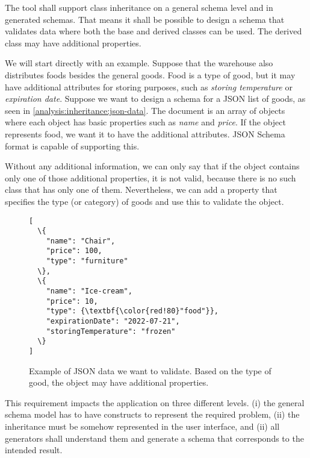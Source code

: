 

\begin{requirement}
    The tool shall support class inheritance on a general schema level and in generated schemas. That means it shall be possible to design a schema that validates data where both the base and derived classes can be used. The derived class may have additional properties.
\end{requirement}

\begin{showcase}
    We will start directly with an example. Suppose that the warehouse also distributes foods besides the general goods. Food is a type of good, but it may have additional attributes for storing purposes, such as \textit{storing temperature} or \textit{expiration date}. Suppose we want to design a schema for a JSON list of goods, as seen in \autoref{analysis:inheritance:json-data}. The document is an array of objects where each object has basic properties such as \textit{name} and \textit{price}. If the object represents food, we want it to have the additional attributes. JSON Schema format is capable of supporting this.

    Without any additional information, we can only say that if the object contains only one of those additional properties, it is not valid, because there is no such class that has only one of them. Nevertheless, we can add a property that specifies the type (or category) of goods and use this to validate the object.
    \begin{figure}[H]\centering
        \begin{Verbatim}[commandchars=\\\{\}]
[
  \{
    "name": "Chair",
    "price": 100,
    "type": "furniture"
  \},
  \{
    "name": "Ice-cream",
    "price": 10,
    "type": {\textbf{\color{red!80}"food"}},
    "expirationDate": "2022-07-21",
    "storingTemperature": "frozen"
  \}
]
        \end{Verbatim}
        \caption{Example of JSON data we want to validate. Based on the type of good, the object may have additional properties.}
        \label{analysis:inheritance:json-data}
    \end{figure}
\end{showcase}

This requirement impacts the application on three different levels. (i) the general schema model has to have constructs to represent the required problem, (ii) the inheritance must be somehow represented in the user interface, and (ii) all generators shall understand them and generate a schema that corresponds to the intended result.

